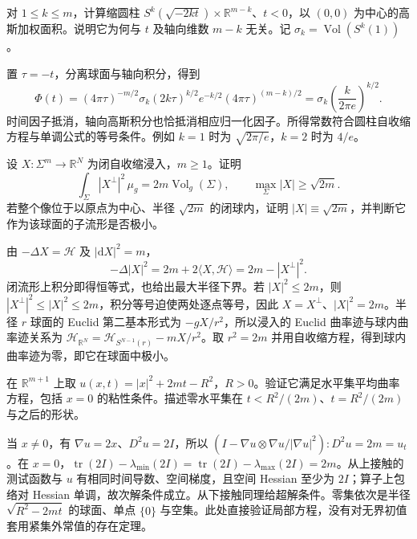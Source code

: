 \begin{exercise}\label{g3:ex:mcf-cylinder-density}
	对 \(1\le k\le m\)，计算缩圆柱 \(S^k(\sqrt{-2kt})\times\mathbb R^{m-k}\)、\(t<0\)，以 \((0,0)\) 为中心的高斯加权面积。说明它为何与 \(t\) 及轴向维数 \(m-k\) 无关。记 \(\sigma_k=\operatorname{Vol}(S^k(1))\)。
\end{exercise}
\begin{solution}
	置 \(\tau=-t\)，分离球面与轴向积分，得到
	\[
		\Phi(t)=(4\pi\tau)^{-m/2}
		\sigma_k(2k\tau)^{k/2}e^{-k/2}
		(4\pi\tau)^{(m-k)/2}
		=\sigma_k\left(\frac{k}{2\pi e}\right)^{k/2}.
	\]
	时间因子抵消，轴向高斯积分也恰抵消相应归一化因子。所得常数符合圆柱自收缩方程与单调公式的等号条件。例如 \(k=1\) 时为 \(\sqrt{2\pi/e}\)，\(k=2\) 时为 \(4/e\)。
\end{solution}

\begin{exercise}\label{g3:ex:mcf-shrinker-radius}
	设 \(X:\Sigma^m\to\mathbb R^N\) 为闭自收缩浸入，\(m\ge1\)。证明
	\[
		\int_\Sigma|X^\perp|^2\,\mu_g=2m\operatorname{Vol}_g(\Sigma),
		\qquad \max_\Sigma|X|\ge\sqrt{2m}.
	\]
	若整个像位于以原点为中心、半径 \(\sqrt{2m}\) 的闭球内，证明 \(|X|\equiv\sqrt{2m}\)，并判断它作为该球面的子流形是否极小。
\end{exercise}
\begin{solution}
	由 \(-\Delta X=\mathcal H\) 及 \(|\mathrm dX|^2=m\)，
	\[
		-\Delta|X|^2=2m+2\langle X,\mathcal H\rangle
		=2m-|X^\perp|^2.
	\]
	闭流形上积分即得恒等式，也给出最大半径下界。若 \(|X|^2\le2m\)，则 \(|X^\perp|^2\le|X|^2\le2m\)，积分等号迫使两处逐点等号，因此 \(X=X^\perp\)、\(|X|^2=2m\)。半径 \(r\) 球面的 Euclid 第二基本形式为 \(-gX/r^2\)，所以浸入的 Euclid 曲率迹与球内曲率迹关系为 \(\mathcal H_{\mathbb R^N}=\mathcal H_{S^{N-1}(r)}-mX/r^2\)。取 \(r^2=2m\) 并用自收缩方程，得到球内曲率迹为零，即它在球面中极小。
\end{solution}

\begin{exercise}\label{g3:ex:mcf-level-radial}
	在 \(\mathbb R^{m+1}\) 上取 \(u(x,t)=|x|^2+2mt-R^2\)，\(R>0\)。验证它满足水平集平均曲率方程，包括 \(x=0\) 的粘性条件。描述零水平集在 \(t<R^2/(2m)\)、\(t=R^2/(2m)\) 与之后的形状。
\end{exercise}
\begin{solution}
	当 \(x\ne0\)，有 \(\nabla u=2x\)、\(D^2u=2I\)，所以
	\((I-\nabla u\otimes\nabla u/|\nabla u|^2):D^2u=2m=u_t\)。在 \(x=0\)，\(\operatorname{tr}(2I)-\lambda_{\min}(2I)=\operatorname{tr}(2I)-\lambda_{\max}(2I)=2m\)。从上接触的测试函数与 \(u\) 有相同时间导数、空间梯度，且空间 Hessian 至少为 \(2I\)；算子上包络对 Hessian 单调，故次解条件成立。从下接触同理给超解条件。零集依次是半径 \(\sqrt{R^2-2mt}\) 的球面、单点 \(\{0\}\) 与空集。此处直接验证局部方程，没有对无界初值套用紧集外常值的存在定理。
\end{solution}

